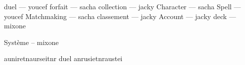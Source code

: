 duel --- youcef
forfait --- sacha
collection --- jacky
Character --- sacha
Spell --- youcef
Matchmaking --- sacha
classement --- jacky
Account --- jacky
deck --- mixone

Système -- mixone


auniretnaurseitnr duel anrusietnraustei